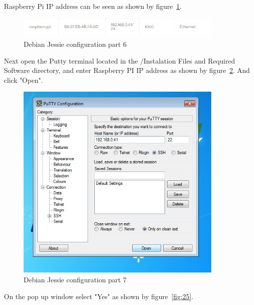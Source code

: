 \documentclass[12pt,]{article}
\begin{document}
Raspberry Pi IP address can be seen as shown by figure~\ref{fig:23}.
\begin{figure}[H]
  	\begin{center}
    	\includegraphics[width=0.9\textwidth]{Ras_5}
  	\end{center}
  	\caption{Debian Jessie configuration part 6}
	\label{fig:23}
\end{figure}
Next open the Putty terminal located in the /Instalation Files and Required Software directory, and enter Raspberry PI IP address as shown by figure~\ref{fig:24}. And click "Open".
\begin{figure}[H]
  	\begin{center}
    	\includegraphics[width=0.9\textwidth]{Ras_6}
  	\end{center}
  	\caption{Debian Jessie configuration part 7}
	\label{fig:24}
\end{figure}
On the pop up window select "Yes" as shown by figure~\ref{fig:25}.
\end{document}
